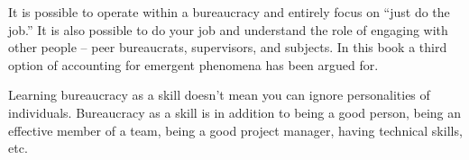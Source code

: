 It is possible to operate within a bureaucracy and entirely focus on ``just do the job.'' It is also possible to do your job and understand the role of engaging with other people -- peer bureaucrats, supervisors, and subjects. In this book a third option of accounting for emergent phenomena has been argued for. 

Learning bureaucracy as a skill doesn't mean you can ignore personalities of individuals. Bureaucracy as a skill is in addition to being a good person, being an effective member of a team, being a good project manager, having technical skills, etc. 

